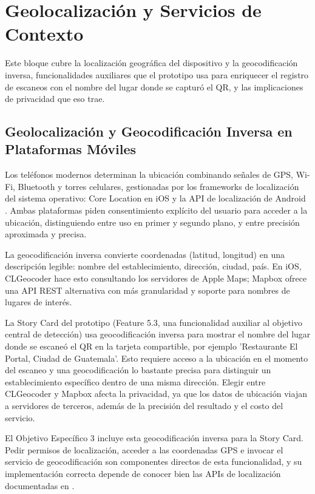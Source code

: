 \section{Geolocalizaci\'on y Servicios de Contexto}

Este bloque cubre la localizaci\'on geogr\'afica del dispositivo y la geocodificaci\'on inversa, funcionalidades auxiliares que el prototipo usa para enriquecer el registro de escaneos con el nombre del lugar donde se captur\'o el QR, y las implicaciones de privacidad que eso trae.

\subsection{Geolocalizaci\'on y Geocodificaci\'on Inversa en Plataformas M\'oviles}

Los tel\'efonos modernos determinan la ubicaci\'on combinando se\~nales de GPS, Wi-Fi, Bluetooth y torres celulares, gestionadas por los frameworks de localizaci\'on del sistema operativo: Core Location en iOS \cite{apple_location_auth} y la API de localizaci\'on de Android \cite{android_location_permissions}. Ambas plataformas piden consentimiento expl\'icito del usuario para acceder a la ubicaci\'on, distinguiendo entre uso en primer y segundo plano, y entre precisi\'on aproximada y precisa.

La geocodificaci\'on inversa convierte coordenadas (latitud, longitud) en una descripci\'on legible: nombre del establecimiento, direcci\'on, ciudad, pa\'is. En iOS, CLGeocoder \cite{apple_clgeocoder} hace esto consultando los servidores de Apple Maps; Mapbox \cite{mapbox_geocoding} ofrece una API REST alternativa con m\'as granularidad y soporte para nombres de lugares de inter\'es.

La Story Card del prototipo (Feature 5.3, una funcionalidad auxiliar al objetivo central de detecci\'on) usa geocodificaci\'on inversa para mostrar el nombre del lugar donde se escane\'o el QR en la tarjeta compartible, por ejemplo 'Restaurante El Portal, Ciudad de Guatemala'. Esto requiere acceso a la ubicaci\'on en el momento del escaneo y una geocodificaci\'on lo bastante precisa para distinguir un establecimiento espec\'ifico dentro de una misma direcci\'on. Elegir entre CLGeocoder y Mapbox \cite{mapbox_geocoding} afecta la privacidad, ya que los datos de ubicaci\'on viajan a servidores de terceros, adem\'as de la precisi\'on del resultado y el costo del servicio.

El Objetivo Espec\'ifico 3 incluye esta geocodificaci\'on inversa para la Story Card. Pedir permisos de localizaci\'on, acceder a las coordenadas GPS e invocar el servicio de geocodificaci\'on son componentes directos de esta funcionalidad, y su implementaci\'on correcta depende de conocer bien las APIs de localizaci\'on documentadas en \cite{apple_location_auth,android_location_permissions}.

